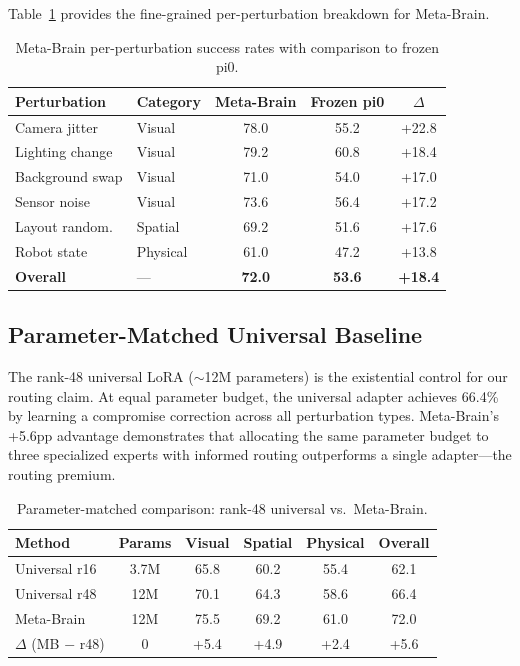 \documentclass[10pt,twocolumn]{article}
\begin{document}
Table~\ref{tab:fine_grained} provides the fine-grained per-perturbation breakdown for Meta-Brain.

\begin{table}[h]
\centering
\caption{Meta-Brain per-perturbation success rates with comparison to frozen pi0.}
\label{tab:fine_grained}
\small
\begin{tabular}{llccc}
\toprule
Perturbation & Category & Meta-Brain & Frozen pi0 & $\Delta$ \\
\midrule
Camera jitter & Visual & 78.0 & 55.2 & +22.8 \\
Lighting change & Visual & 79.2 & 60.8 & +18.4 \\
Background swap & Visual & 71.0 & 54.0 & +17.0 \\
Sensor noise & Visual & 73.6 & 56.4 & +17.2 \\
Layout random. & Spatial & 69.2 & 51.6 & +17.6 \\
Robot state & Physical & 61.0 & 47.2 & +13.8 \\
\midrule
\textbf{Overall} & --- & \textbf{72.0} & \textbf{53.6} & \textbf{+18.4} \\
\bottomrule
\end{tabular}
\end{table}

\subsection{Parameter-Matched Universal Baseline}
\label{sec:param_matched}

The rank-48 universal LoRA (${\sim}$12M parameters) is the existential control for our routing claim.
At equal parameter budget, the universal adapter achieves 66.4\% by learning a compromise correction across all perturbation types.
Meta-Brain's +5.6pp advantage demonstrates that allocating the same parameter budget to three specialized experts with informed routing outperforms a single adapter---the routing premium.

\begin{table}[h]
\centering
\caption{Parameter-matched comparison: rank-48 universal vs.\ Meta-Brain.}
\label{tab:param_matched}
\small
\begin{tabular}{lccccc}
\toprule
Method & Params & Visual & Spatial & Physical & Overall \\
\midrule
Universal r16 & 3.7M & 65.8 & 60.2 & 55.4 & 62.1 \\
Universal r48 & 12M & 70.1 & 64.3 & 58.6 & 66.4 \\
Meta-Brain & 12M & 75.5 & 69.2 & 61.0 & 72.0 \\
$\Delta$ (MB $-$ r48) & 0 & +5.4 & +4.9 & +2.4 & +5.6 \\
\bottomrule
\end{tabular}
\end{table}
\end{document}
